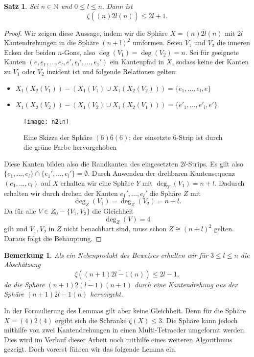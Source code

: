 \documentclass[12pt,titlepage,twoside,cleardoublepage]{article}
\theoremstyle{nummermitklammern}
\newtheorem{bemerkung}[temp]{Bemerkung}
\newtheorem{satz}[temp]{Satz}
\newtheorem{bemerkung}[zahl]{Bemerkung}
\newtheorem{satz}[zahl]{Satz}
\numberwithin{equation}{section}
\begin{document}
\begin{satz}
Sei $n\in \mathbb{N}$ und $0\leq l \leq n.$ Dann ist 
\[
\zeta((n)\overline{2l}(n))\leq 2l+1.
\]
\end{satz}
\begin{proof}
Wir zeigen diese Aussage, indem wir die Sphäre $X=(n)\overline{2l}(n)$ mit $2l$ Kantendrehungen in die Sphäre $(n+l)^2$ umformen. Seien $V_1$ und $V_2$ die inneren Ecken der beiden $n$-Gons, also $\deg(V_1)=\deg(V_2)=n$. Sei für geeignete Kanten $(e,e_1,\ldots,e_l,e',e_l',\ldots,e_1')$ ein Kantenpfad in $X$, sodass keine der Kanten zu $V_1$ oder $V_2$ inzident ist und folgende Relationen gelten:
\begin{itemize}
\item $X_1(X_2(V_1))-(X_1(V_1)\cup X_1(X_2(V_2)))=\{e_1,\ldots,e_l,e\}$
\item $X_1(X_2(V_2))-(X_1(V_2)\cup X_1(X_2(V_1)))=\{e'_1,\ldots,e'_l,e'\}$
\end{itemize}
\begin{figure}[H]
\begin{center}
\texttt{[image: n2ln]}
\end{center}
\caption{Eine Skizze der Sphäre $(6)\overline{6}(6)$; der einsetzte 6-Strip ist durch die grüne Farbe hervorgehoben}
\end{figure}
Diese Kanten bilden also die Randkanten des eingesetzten $2l$-Strips.
Es gilt also $\{e_1,\ldots,e_l\}\cap\{e_1',\ldots,e_l'\}=\emptyset.$
Durch Anwenden der drehbaren Kantensequenz $(e_1,\ldots,e_l)$ auf $X$ erhalten wir eine Sphäre $Y$ mit $\deg_Y(V_1)=n+l.$ Dadurch erhalten wir durch drehen der Kanten $e_1',\ldots,e_l'$ die Sphäre $Z$ mit 
\[
\deg_Z(V_1)=\deg_Z(V_2)=n+l.
\]
Da für alle $V\in Z_0-\{V_1,V_2\}$ die Gleichheit 
\[
\deg_Z(V)=4
\]
gilt und $V_1,V_2$ in $Z$ nicht benachbart sind, muss schon $Z\cong (n+l)^2$ gelten. Daraus folgt die Behauptung.
\end{proof}
\begin{bemerkung}
Als ein Nebenprodukt des Beweises erhalten wir für $3\leq l\leq n$ die Abschätzung 
\[
\zeta((n+1)\overline{2l-1}(n))\leq 2l-1,
\]
da die Sphäre $(n+1)\overline{2(l-1)}(n+1)$ durch eine Kantendrehung aus der Sphäre $(n+1)\overline{2l-1}(n)$ hervorgeht.
\end{bemerkung}
In der Formulierung des Lemmas gilt aber keine Gleichheit.
Denn für die Sphäre $X=(4)\overline{2}(4)$ ergibt sich die Schranke $\zeta(X)\leq 3.$ Die Sphäre kann jedoch mithilfe von zwei Kantendrehungen in einen Multi-Tetraeder umgeformt werden. Dies wird im Verlauf dieser Arbeit noch mithilfe eines weiteren Algorithmus gezeigt. Doch vorerst führen wir das folgende Lemma ein.
\end{document}
